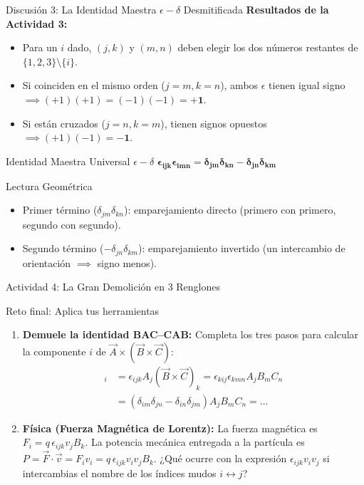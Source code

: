 \documentclass[10pt,aspectratio=169]{beamer}
\begin{document}
\begin{frame}{Discusión 3: La Identidad Maestra $\epsilon-\delta$ Desmitificada}
  \small
  \textbf{Resultados de la Actividad 3:}
  \begin{itemize}
    \item Para un $i$ dado, $(j,k)$ y $(m,n)$ deben elegir los dos números restantes de $\{1, 2, 3\} \setminus \{i\}$.
    \item Si coinciden en el mismo orden ($j=m, k=n$), ambos $\epsilon$ tienen igual signo $\implies (+1)(+1) = (-1)(-1) = \mathbf{+1}$.
    \item Si están cruzados ($j=n, k=m$), tienen signos opuestos $\implies (+1)(-1) = \mathbf{-1}$.
  \end{itemize}
  \begin{block}{Identidad Maestra Universal $\epsilon-\delta$}
    \centering $\mathbf{\epsilon_{ijk}\epsilon_{imn} = \delta_{jm}\delta_{kn} - \delta_{jn}\delta_{km}}$
  \end{block}
  \begin{exampleblock}{Lectura Geométrica}
    \begin{itemize}
      \item Primer término ($\delta_{jm}\delta_{kn}$): emparejamiento directo (primero con primero, segundo con segundo).
      \item Segundo término ($-\delta_{jn}\delta_{km}$): emparejamiento invertido (un intercambio de orientación $\implies$ signo menos).
    \end{itemize}
  \end{exampleblock}
\end{frame}

\begin{frame}{Actividad 4: La Gran Demolición en 3 Renglones}
  \begin{block}{Reto final: Aplica tus herramientas}
    \small
    \begin{enumerate}
      \item[(a)] \textbf{Demuele la identidad BAC--CAB:}
      Completa los tres pasos para calcular la componente $i$ de $\vec{A} \times (\vec{B} \times \vec{C})$:
      \begin{align*}
        [\vec{A} \times (\vec{B} \times \vec{C})]_i &= \epsilon_{ijk} A_j (\vec{B}\times\vec{C})_k = \epsilon_{kij}\epsilon_{kmn} A_j B_m C_n \\
        &= (\delta_{im}\delta_{jn} - \delta_{in}\delta_{jm}) A_j B_m C_n = \dots
      \end{align*}
      \item[(b)] \textbf{Física (Fuerza Magnética de Lorentz):}
      La fuerza magnética es $F_i = q\,\epsilon_{ijk} v_j B_k$. La potencia mecánica entregada a la partícula es $P = \vec{F}\cdot\vec{v} = F_i v_i = q\,\epsilon_{ijk} v_i v_j B_k$.
      ¿Qué ocurre con la expresión $\epsilon_{ijk} v_i v_j$ si intercambias el nombre de los índices mudos $i \leftrightarrow j$?
    \end{enumerate}
  \end{block}
\end{frame}
\end{document}
